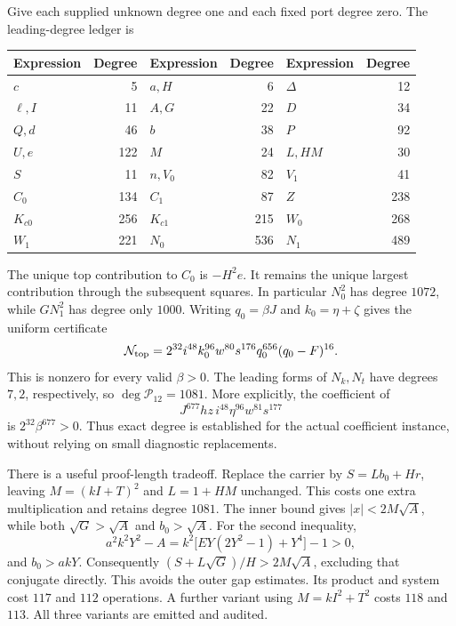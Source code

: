 \documentclass[11pt,a4paper]{article}
\theoremstyle{remark}\newtheorem{remark}[theorem]{Remark}
\begin{document}
Give each supplied unknown degree one and each fixed port degree zero.
The leading-degree ledger is
\begin{center}\small
\begin{tabular}{@{}lr@{\qquad}lr@{\qquad}lr@{}}
\toprule
Expression & Degree & Expression & Degree & Expression & Degree\\
\midrule
$c$ & 5 & $a,H$ & 6 & $\Delta$ & 12\\
$\ell,I$ & 11 & $A,G$ & 22 & $D$ & 34\\
$Q,d$ & 46 & $b$ & 38 & $P$ & 92\\
$U,e$ & 122 & $M$ & 24 & $L,HM$ & 30\\
$S$ & 11 & $n,V_0$ & 82 & $V_1$ & 41\\
$C_0$ & 134 & $C_1$ & 87 & $Z$ & 238\\
$K_{c0}$ & 256 & $K_{c1}$ & 215 & $W_0$ & 268\\
$W_1$ & 221 & $N_0$ & 536 & $N_1$ & 489\\
\bottomrule
\end{tabular}
\end{center}
The unique top contribution to $C_0$ is $-H^2e$.
It remains the unique largest contribution through the subsequent
squares. In particular $N_0^2$ has degree $1072$, while
$GN_1^2$ has degree only $1000$.
Writing $q_0=\beta J$ and $k_0=\eta+\zeta$ gives the uniform certificate
\begin{equation}
 \mathcal N_{\rm top}
 =2^{32}i^{48}k_0^{96}w^{80}s^{176}q_0^{656}(q_0-F)^{16}.
 \label{eq:leader}
\end{equation}
This is nonzero for every valid $\beta>0$. The leading forms of $N_k,N_t$
have degrees $7,2$, respectively, so $\deg\mathcal P_{12}=1081$.
More explicitly, the coefficient of
\[
 J^{677}hz\,i^{48}\eta^{96}w^{81}s^{177}
\]
is $2^{32}\beta^{677}>0$. Thus exact degree is established for the actual
coefficient instance, without relying on small diagnostic replacements.

There is a useful proof-length tradeoff. Replace the carrier by
$S=Lb_0+Hr$, leaving $M=(kI+T)^2$ and $L=1+HM$ unchanged.
This costs one extra multiplication and retains degree $1081$.
The inner bound gives $|x|<2M\sqrt A$, while both $\sqrt G>\sqrt A$
and $b_0>\sqrt A$. For the second inequality,
\[
 a^2k^2Y^2-A=k^2\bigl[EY(2Y^2-1)+Y^4\bigr]-1>0,
\]
and $b_0>akY$. Consequently
$(S+L\sqrt G)/H>2M\sqrt A$, excluding that conjugate directly.
This avoids the outer gap estimates. Its product and system cost
$117$ and $112$ operations. A further variant using $M=kI^2+T^2$
costs $118$ and $113$. All three variants are emitted and audited.
\end{document}
